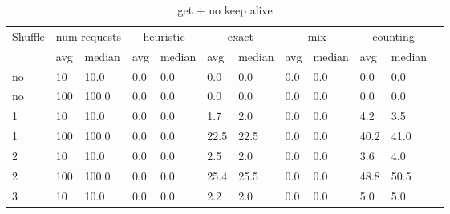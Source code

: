 \documentclass[12pt,a4paper]{report}
\begin{document}
\begin{table}[h]
	\centering
	\caption{get + no keep alive}
	\label{tab:get_nka}
	\begin{tabular}{|l|l|l|l|l|l|l|l|l|l|l|l|}
		\hline
		\multirow{2}{*}{Shuffle} & \multicolumn{2}{|c|}{num requests} & \multicolumn{2}{|c|}{heuristic} & \multicolumn{2}{|c|}{exact} & \multicolumn{2}{|c|}{mix} & \multicolumn{2}{|c|}{counting}                                         \\ \cline{2-11}
		                         & avg                                & median                          & avg                         & median                    & avg                            & median & avg & median & avg  & median \\ \hline
		no                       & 10                                 & 10.0                            & 0.0                         & 0.0                       & 0.0                            & 0.0    & 0.0 & 0.0    & 0.0  & 0.0    \\ \hline
		no                       & 100                                & 100.0                           & 0.0                         & 0.0                       & 0.0                            & 0.0    & 0.0 & 0.0    & 0.0  & 0.0    \\ \hline
		1                        & 10                                 & 10.0                            & 0.0                         & 0.0                       & 1.7                            & 2.0    & 0.0 & 0.0    & 4.2  & 3.5    \\ \hline
		1                        & 100                                & 100.0                           & 0.0                         & 0.0                       & 22.5                           & 22.5   & 0.0 & 0.0    & 40.2 & 41.0   \\ \hline
		2                        & 10                                 & 10.0                            & 0.0                         & 0.0                       & 2.5                            & 2.0    & 0.0 & 0.0    & 3.6  & 4.0    \\ \hline
		2                        & 100                                & 100.0                           & 0.0                         & 0.0                       & 25.4                           & 25.5   & 0.0 & 0.0    & 48.8 & 50.5   \\ \hline
		3                        & 10                                 & 10.0                            & 0.0                         & 0.0                       & 2.2                            & 2.0    & 0.0 & 0.0    & 5.0  & 5.0    \\ \hline

\end{tabular}
\end{table}
\end{document}
